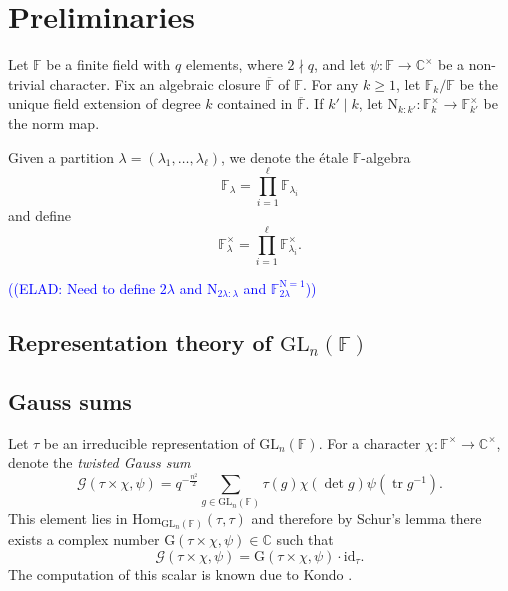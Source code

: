 \documentclass[12pt, reqno]{amsart}
\theoremstyle{definition}
\theoremstyle{definition}
\theoremstyle{definition}
\newcommand{\cComplex}{\mathbb{C}}
\newcommand{\multiplicativegroup}[1]{#1^{\times}}
\newcommand{\Hom}{\mathrm{Hom}}
\newcommand{\idmap}{\mathrm{id}}
\newcommand{\etale}{\'etale }
\newcommand{\fieldCharacter}{\psi}
\newcommand{\trace}{\operatorname{tr}}
\newcommand{\GL}{\mathrm{GL}}
\newcommand{\FieldNorm}[2]{\mathrm{N}_{#1:#2}}
\newcommand{\aFieldNorm}{\mathrm{N}}
\newcommand{\finiteField}{\mathbb{F}}
\newcommand{\finiteFieldExtension}[1]{\finiteField_{#1}}
\newcommand{\NormOneGroup}[1]{\finiteFieldExtension{#1}^{\aFieldNorm = 1}}
\newcommand{\algebraicClosure}[1]{\overline{#1}}
\newcommand{\GaussSum}[2]{\mathcal{G}\left(#1, #2\right)}
\newcommand{\GaussSumScalar}[2]{\mathrm{G}\left(#1, #2\right)}
\newcommand{\elad}[1]{\textcolor{blue}{\sffamily ((ELAD: #1))}}
\begin{document}
\section{Preliminaries}
Let $\finiteField$ be a finite field with $q$ elements, where $2 \nmid q$, and let $\fieldCharacter \colon \finiteField \to \multiplicativegroup{\cComplex}$ be a non-trivial character. Fix an algebraic closure $\algebraicClosure{\finiteField}$ of $\finiteField$. For any $k \ge 1$, let $\finiteFieldExtension{k} \slash \finiteField$ be the unique field extension of degree $k$ contained in $\algebraicClosure{\finiteField}$. If $k' \mid k$, let $\FieldNorm{k}{k'} \colon \multiplicativegroup{\finiteFieldExtension{k}} \to \multiplicativegroup{\finiteFieldExtension{k'}}$ be the norm map.

Given a partition $\lambda = \left(\lambda_1, \dots, \lambda_\ell\right)$, we denote the \etale $\finiteField$-algebra $$\finiteFieldExtension{\lambda} = \prod_{i=1}^{\ell} \finiteFieldExtension{\lambda_i}$$ and define
$$\multiplicativegroup{\finiteFieldExtension{\lambda}} = \prod_{i=1}^{\ell} \multiplicativegroup{\finiteFieldExtension{\lambda_i}}.$$

\elad{Need to define $2 \lambda$ and $\FieldNorm{2\lambda}{\lambda}$ and $\NormOneGroup{2 \lambda}$}

\subsection{Representation theory of $\GL_n\left(\finiteField\right)$}

\subsection{Gauss sums}

Let $\tau$ be an irreducible representation of $\GL_n\left(\finiteField\right)$. 
For a character $\chi \colon \multiplicativegroup{\finiteField} \to \multiplicativegroup{\cComplex}$, denote the \emph{twisted Gauss sum}
$$\GaussSum{\tau \times \chi}{\fieldCharacter} = q^{-\frac{n^2}{2}} \sum_{g \in \GL_n\left(\finiteField\right)} \tau\left(g\right) \chi\left(\det g\right) \fieldCharacter\left(\trace g^{-1}\right).$$
This element lies in $\Hom_{\GL_n\left(\finiteField\right)}\left(\tau, \tau\right)$ and therefore by Schur's lemma there exists a complex number $\GaussSumScalar{\tau \times \chi}{\fieldCharacter} \in \cComplex$ such that
$$\GaussSum{\tau \times \chi}{\fieldCharacter} = \GaussSumScalar{\tau \times \chi}{\fieldCharacter} \cdot \idmap_\tau.$$ The computation of this scalar is known due to Kondo \cite{Kondo1963}.
\end{document}
